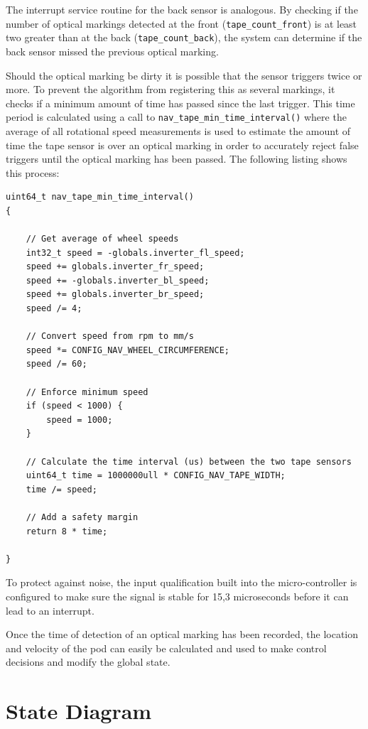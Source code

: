 The interrupt service routine for the back sensor is analogous. By checking if the number of optical markings detected at the front (\texttt{tape_count_front}) is at least two greater than at the back (\texttt{tape_count_back}), the system can determine if the back sensor missed the previous optical marking.

Should the optical marking be dirty it is possible that the sensor triggers twice or more. To prevent the algorithm from registering this as several markings, it checks if a minimum amount of time has passed since the last trigger. This time period is calculated using a call to \texttt{nav_tape_min_time_interval()} where the average of all rotational speed measurements is used to estimate the amount of time the tape sensor is over an optical marking in order to accurately reject false triggers until the optical marking has been passed. The following listing shows this process:

\begin{verbatim}
uint64_t nav_tape_min_time_interval()
{

    // Get average of wheel speeds
    int32_t speed = -globals.inverter_fl_speed;
    speed += globals.inverter_fr_speed;
    speed += -globals.inverter_bl_speed;
    speed += globals.inverter_br_speed;
    speed /= 4;

    // Convert speed from rpm to mm/s
    speed *= CONFIG_NAV_WHEEL_CIRCUMFERENCE;
    speed /= 60;

    // Enforce minimum speed
    if (speed < 1000) {
        speed = 1000;
    }

    // Calculate the time interval (us) between the two tape sensors
    uint64_t time = 1000000ull * CONFIG_NAV_TAPE_WIDTH;
    time /= speed;

    // Add a safety margin
    return 8 * time;

}
\end{verbatim}

To protect against noise, the input qualification built into the micro-controller is configured to make sure the signal is stable for 15,3 microseconds before it can lead to an interrupt.

Once the time of detection of an optical marking has been recorded, the location and velocity of the pod can easily be calculated and used to make control decisions and modify the global state.

\section{State Diagram}


